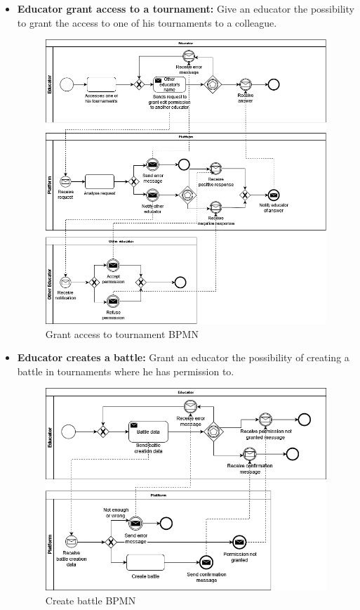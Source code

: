 \documentclass{article}
\begin{document}
{\begin{itemize}
            \item \textbf{Educator grant access to a tournament:} Give an educator the possibility to grant the access to one of his tournaments to a colleague.
            \begin{figure}[H]
                \centering
                \includegraphics[scale=0.4]{images/BPMN/BPMN10.png}
                \caption{Grant access to tournament BPMN}
                \label{fig:accessGrantTournamentBPMN}
            \end{figure}

            \item \textbf{Educator creates a battle:} Grant an educator the possibility of creating a battle in tournaments where he has permission to.
            \begin{figure}[H]
                \centering
                \includegraphics[scale=0.4]{images/BPMN/BPMN11.png}
                \caption{Create battle BPMN}
                \label{fig:createBattleBPMN}
            \end{figure}


\end{itemize}}
\end{document}
